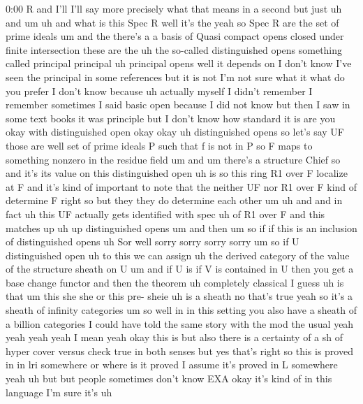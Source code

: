 \begin{unfinished}{0:00}
R  and  I'll  I'll  say  more  precisely  what
that  means  in  a  second  but  just
uh  and
um  uh  and  what  is  this  Spec  R  well  it's
the  yeah  so  Spec  R
are  the  set  of  prime
ideals  um  and  the  there's  a  a  basis  of
Quasi  compact
opens  closed  under  finite
intersection  these  are  the  uh  the
so-called  distinguished
opens
something  called  principal  principal  uh
principal  opens  well  it  depends  on  I
don't  know  I've  seen  the  principal  in
some  references  but  it  is  not  I'm  not
sure  what  it  what  do  you  prefer  I  don't
know  because  uh  actually  myself  I  didn't
remember  I  remember  sometimes  I  said
basic  open  because  I  did  not  know  but
then  I  saw  in  some  text  books  it  was
principle  but  I  don't  know  how  standard
it  is  are  you  okay  with  distinguished
open
okay  okay  uh  distinguished  opens  so
let's  say
UF  those  are  well  set  of  prime  ideals  P
such  that  f  is  not  in  P  so  F  maps  to
something  nonzero  in  the  residue  field
um  and  um  there's  a  structure
Chief  so  and  it's  its  value  on  this
distinguished  open  uh  is  so  this  ring  R1
over  F  localize  at  F  and  it's  kind  of
important  to  note  that  the  neither  UF
nor  R1  over  F  kind  of  determine  F  right
so  but  they  they  do  determine  each  other
um  uh  and  and  in  fact  uh  this  UF
actually  gets  identified  with
spec  uh  of  R1  over  F  and  this  matches
up
uh  up  distinguished
opens
um  and  then  um  so  if  if  this  is  an
inclusion  of  distinguished  opens  uh  Sor
well  sorry  sorry  sorry  sorry  um  so  if  U
distinguished
open  uh  to  this  we  can  assign  uh  the
derived  category  of  the  value  of  the
structure  sheath  on
U  um  and  if  U  is  if  V  is  contained  in  U
then  you  get  a  base  change
functor  and  then  the  theorem  uh
completely  classical  I  guess  uh  is  that
um  this  she  she  or  this  pre-
sheie  uh  is  a
sheath  no  that's  true
yeah  so  it's  a  sheath  of  infinity
categories
um  so  well  in  in  this  setting  you  also
have  a  sheath  of  a  billion  categories  I
could  have  told  the  same  story  with  the
mod  the
usual  yeah  yeah  yeah  yeah  I  mean  yeah
okay  this  is  but  also  there  is  a
certainty  of  a  sh
of  hyper  cover  versus  check  true  in  both
senses  but  yes  that's  right  so  this  is
proved  in  in  lri  somewhere  or  where  is
it  proved  I  assume  it's  proved  in  L
somewhere  yeah  uh  but  but  people
sometimes  don't  know  EXA  okay  it's  kind
of  in  this  language  I'm  sure  it's  uh

\end{unfinished}
